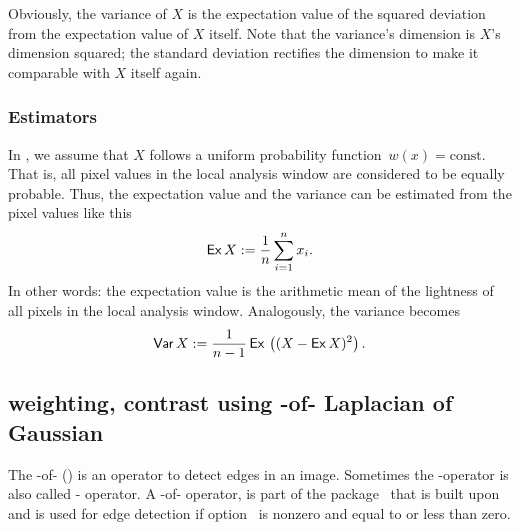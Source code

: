 Obviously, the variance of $X$ is the expectation value of the squared deviation from the
expectation value of $X$ itself.  Note that the variance's dimension is $X$'s dimension squared;
the standard deviation rectifies the dimension to make it comparable with $X$ itself again.


\subsubsection[Estimators]{\label{sec:estimators}%
  Estimators}

In \App{}, we assume that $X$ follows a uniform probability function~$w(x) = \mbox{const.}$ That
is, all pixel values in the local analysis window are considered to be equally probable.  Thus,
the expectation value and the variance can be estimated from the pixel values like this
\[
    \mbox{\textsf{Ex}\,} X := \frac{1}{n} \sum_{i = 1}^n x_i.
\]
\noindent In other words: the expectation value is the arithmetic mean of the lightness of all
pixels in the local analysis window.  Analogously, the variance becomes
\[
    \mbox{\textsf{Var}\,} X :=
    \frac{1}{n - 1} \, \mbox{\textsf{Ex}\,}\left( (X - \mbox{\textsf{Ex}\,} X)^2 \right).
\]


\subsection[Laplacian of Gaussian]{\label{sec:laplacian-of-gaussian}%
         {weighting, contrast using -of-}%
  Laplacian of Gaussian}

%
%
\begin{sloppypar}
  The -of- () is an operator to detect
  edges in an image.  Sometimes the -operator is also called
  - operator.  A
  -of- operator,
   is part of the
  package~ that \App{} is built upon and is used for edge
  detection if option~ is nonzero and
   equal to or less than zero.
\end{sloppypar}

